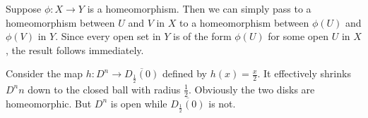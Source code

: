 \documentclass[../../solutions.tex]{subfiles}
\begin{document}
\begin{exercise} \leavevmode
Suppose $\phi:X\to Y$ is a homeomorphism.
Then we can simply pass to a homeomorphism between $U$ and $V$ in $X$ to a homeomorphism between $\phi(U)$ and $\phi(V)$ in $Y$.
Since every open set in $Y$ is of the form $\phi(U)$ for some open $U$ in $X$, the result follows immediately.
\end{exercise}

\begin{exercise} \leavevmode
Consider the map $h:D^n\to\overline{D_{\frac12}(0)}$ defined by $h(x)=\frac x2$.
It effectively shrinks $D^nn$ down to the closed ball with radius $\frac12$.
Obviously the two disks are homeomorphic.
But $D^n$ is open while $\overline{D_{\frac12}(0)}$ is not.
\end{exercise}
\end{document}

